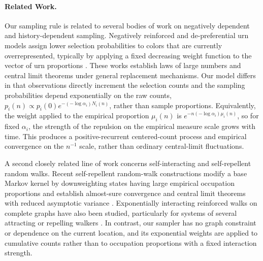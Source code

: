 \paragraph*{Related Work.}
Our sampling rule is related to several bodies of work on negatively dependent and history-dependent
sampling. Negatively reinforced and de-preferential urn models assign lower selection probabilities to colors that
 are currently overrepresented, typically by applying a fixed decreasing weight function to the vector of urn
 proportions \citep{bandyopadhyay2018_linear_depreferential_urn,kaur2019_negatively_reinforced_balanced_urn_schemes}.
 These works establish laws of large numbers and central limit theorems under general replacement mechanisms.
 Our model differs in that observations directly increment the selection counts and the sampling probabilities
 depend exponentially on the raw counts, $p_i(n) \propto p_i(0) e^{-(-\log \alpha_i)N_i(n)}$, rather
 than sample proportions. Equivalently, the weight applied to the empirical proportion $\mu_i(n)$ is $e^{-n(-\log \alpha_i)\mu_i(n)}$,
 so for fixed $\alpha_i$, the strength of the repulsion on the empirical measure scale grows with time. This produces a
 positive-recurrent centered-count process and empirical convergence on the $n^{-1}$ scale,
 rather than ordinary central-limit fluctuations.

A second closely related line of work concerns self-interacting and self-repellent
random walks. Recent self-repellent random-walk constructions modify a base Markov kernel
by downweighting states having large empirical occupation proportions and establish almost-sure
convergence and central limit theorems with reduced asymptotic variance
\cite{doshi2024_self_repellent_random_walks_general_graphs}. Exponentially interacting reinforced
walks on complete graphs have also been studied, particularly for systems of several
attracting or repelling walkers \cite{rosales2022_vertex_reinforced_exponential_interaction}.
In contrast, our sampler has no graph constraint or dependence on the current location, and its
exponential weights are applied to cumulative counts rather than to occupation proportions with a
fixed interaction strength.

